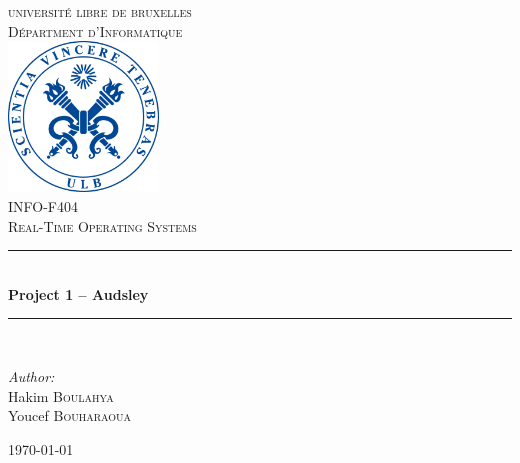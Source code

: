 \documentclass[letterpaper]{article}
\newcommand{\HRule}{\rule{\linewidth}{0.5mm}} %
\begin{document}
\begin{titlepage}
\begin{center}


\textsc{\LARGE universit\'e libre de bruxelles}\\[1.0cm]
\textsc{\Large D\'epartment d'Informatique}\\[1.5cm]

\includegraphics[width=0.3\textwidth]{Images/ulblogo.jpg}~\\[1cm]

\textsc{
\large INFO-F404 \\
\Large  Real-Time Operating Systems
 \\[1cm]}
\HRule \\[0.7cm]

{ \huge \bfseries Project 1 – Audsley  \\[0.7cm] }

\HRule \\[2cm]

\noindent
\begin{center} \large

\emph{Author:}\\
\Large Hakim \textsc{Boulahya}\\
Youcef \textsc{Bouharaoua}
\end{center}
\begin{center} \large


\end{center}

\vfill

{\large \today}

\end{center}
\end{titlepage}

\tableofcontents
\newpage
\end{document}
